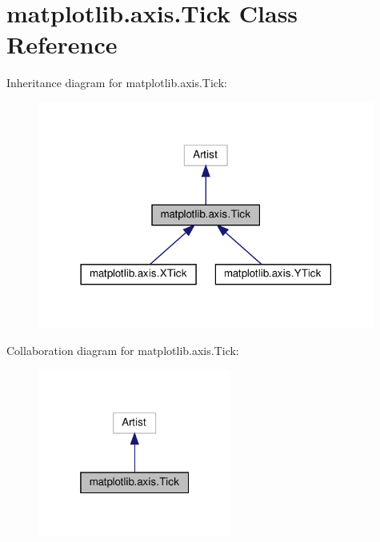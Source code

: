 \hypertarget{classmatplotlib_1_1axis_1_1Tick}{}\section{matplotlib.\+axis.\+Tick Class Reference}
\label{classmatplotlib_1_1axis_1_1Tick}


Inheritance diagram for matplotlib.\+axis.\+Tick\+:
\nopagebreak
\begin{figure}[H]
\begin{center}
\leavevmode
\includegraphics[width=314pt]{classmatplotlib_1_1axis_1_1Tick__inherit__graph}
\end{center}
\end{figure}


Collaboration diagram for matplotlib.\+axis.\+Tick\+:
\nopagebreak
\begin{figure}[H]
\begin{center}
\leavevmode
\includegraphics[width=181pt]{classmatplotlib_1_1axis_1_1Tick__coll__graph}
\end{center}
\end{figure}
